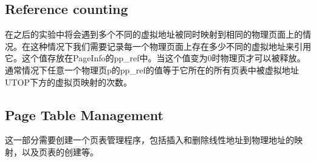 \subsection{Reference counting}
\label{sub:reference_counting}

\par 在之后的实验中将会遇到多个不同的虚拟地址被同时映射到相同的物理页面上的情况。在这种情况下我们需要记录每一个物理页面上存在多少不同的虚拟地址来引用它。这个值存放在PageInfo的pp\_ref中。当这个值变为0时物理页才可以被释放。通常情况下任意一个物理页p的pp\_ref的值等于它所在的所有页表中被虚拟地址UTOP下方的虚拟页映射的次数。

\subsection{Page Table Management}
\label{sub:page_table_management}
\par 这一部分需要创建一个页表管理程序，包括插入和删除线性地址到物理地址的映射，以及页表的创建等。

